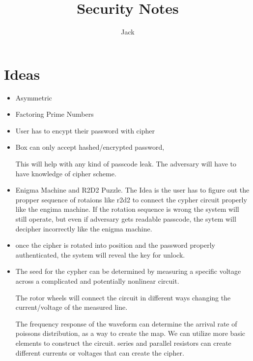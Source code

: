 \documentclass[]{scrartcl}
\title{Security Notes}
\author{Jack}
\begin{document}
\maketitle

\begin{abstract}

\end{abstract}

\section{Ideas}

\begin{itemize}
	\item Asymmetric
	
	\item Factoring Prime Numbers
	
	\item User has to encypt their password with cipher
	
	\item Box can only accept hashed/encrypted password,
	
	\subitem This will help with any kind of passcode leak.  The adversary will have to have knowledge of cipher scheme.
	
	
	\item Enigma Machine and R2D2 Puzzle.  The Idea is the user has to figure out the propper sequence of rotaions like r2d2 to connect the cypher circuit properly like the engima machine.   If the rotation sequence is wrong the system will still operate, but even if adversary gets readable passcode, the sytem will decipher incorrectly like the enigma machine.
	
	
	\item once the cipher is rotated into position and the password properly authenticated, the system will reveal the key for unlock.  
	
	\item The seed for the cypher can be determined by measuring a specific voltage across a complicated and potentially nonlinear circuit.
	
	\subitem The rotor wheels will connect the circuit in different ways changing the current/voltage of the measured line.
	
	\subitem The frequency response  of the waveform can determine the arrival rate of poissons distribution, as a way to create the map.   We can utilize more basic elements to construct  the circuit. series and parallel resistors can create different currents or voltages that can create the cipher.
	
	
	
	
	

\end{itemize}
\end{document}
